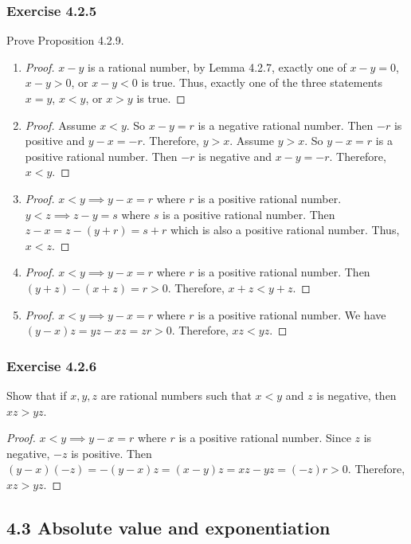 \documentclass[12pt, letter]{article}
\begin{document}
\subsubsection*{Exercise 4.2.5}
Prove Proposition 4.2.9.
\begin{enumerate}[label=(\alph*)]
    \item \begin{proof}
        $x-y$ is a rational number, by Lemma 4.2.7, exactly one of $x-y=0$, $x-y>0$, or $x-y<0$ is true. Thus, exactly one of the three statements $x=y$, $x<y$, or 
        $x>y$ is true.
    \end{proof}
    \item \begin{proof}
        Assume $x<y$. So $x-y=r$ is a negative rational number. Then $-r$ is positive and $y-x=-r$. Therefore, $y>x$. 
        Assume $y>x$. So $y-x=r$ is a positive rational number. Then $-r$ is negative and $x-y=-r$. Therefore, $x<y$.
    \end{proof}
    \item \begin{proof}
        $x<y\implies y-x=r$ where $r$ is a positive rational number. $y<z\implies z-y=s$ where $s$ is a positive rational number. Then $z-x=z-(y+r)=s+r$ which is also 
        a positive rational number. Thus, $x<z$.
    \end{proof}
    \item \begin{proof}
        $x<y\implies y-x=r$ where $r$ is a positive rational number. Then $(y+z)-(x+z)=r>0$. Therefore, $x+z<y+z$.
    \end{proof}
    \item \begin{proof}
        $x<y\implies y-x=r$ where $r$ is a positive rational number. We have $(y-x)z=yz-xz=zr>0$. Therefore, $xz<yz$.
    \end{proof}
\end{enumerate}
\subsubsection*{Exercise 4.2.6}
Show that if $x,y,z$ are rational numbers such that $x<y$ and $z$ is negative, then $xz>yz$.
\begin{proof}
    $x<y\implies y-x=r$ where $r$ is a positive rational number. Since $z$ is negative, $-z$ is positive. Then $(y-x)(-z)=-(y-x)z=(x-y)z=xz-yz=(-z)r>0$.
    Therefore, $xz>yz$. 
\end{proof}
\subsection*{4.3 Absolute value and exponentiation}
\end{document}
